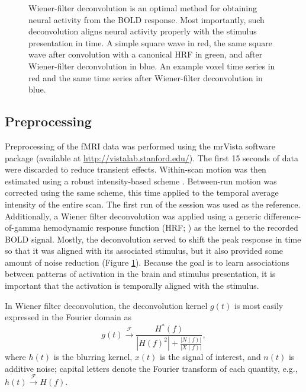 \documentclass[preprint,5p,authoryear]{elsarticle}
\begin{document}
\begin{figure}
\begin{subfigure}{0.4\textwidth}
\caption{}
\label{fig:wiener-voxel}
\end{subfigure}
\caption{
Wiener-filter deconvolution is an optimal method for obtaining neural activity from the BOLD response.
Most importantly, such deconvolution aligns neural activity properly with the stimulus presentation in time.
 A simple square wave in red, the same square wave after convolution with a canonical HRF in green, and after Wiener-filter deconvolution in blue. 
 An example voxel time series in red and the same time series after Wiener-filter deconvolution in blue.}
\label{fig:wiener-deconvolution}
\end{figure}

\subsection{Preprocessing}
Preprocessing of the fMRI data was performed using the mrVista software package (available at \url{http://vistalab.stanford.edu/}). 
The first 15 seconds of data  were discarded to reduce transient effects.
Within-scan motion was then estimated using a robust intensity-based scheme \citep{Nestares2000}. 
Between-run motion was corrected using the same scheme, this time applied to the temporal average intensity of the entire scan. 
The first run of the session was used as the reference. 
Additionally, a Wiener filter deconvolution \citep{Poor1980} was applied using a generic difference-of-gamma hemodynamic response function (HRF; \cite{Glover1999}) as the kernel to the recorded BOLD signal.
Mostly, the deconvolution served to shift the peak response in time so that it was aligned with its associated stimulus, but it also provided some amount of noise reduction (Figure \ref{fig:wiener-voxel}).
Because the goal is to learn associations between patterns of activation in the brain and stimulus presentation, it is important that the activation is temporally aligned with the stimulus.

In Wiener filter deconvolution, the deconvolution kernel $g(t)$ is most easily expressed in the Fourier domain as
\begin{equation}
g(t) \xrightarrow{\mathcal{F}} \frac{H^{*}(f)}{\left|H(f)^{2}\right| + \frac{\left| N(f) \right|}{\left| X(f) \right|}},
\end{equation}
where $h(t)$ is the blurring kernel, $x(t)$ is the signal of interest, and $n(t)$ is additive noise; capital letters denote the Fourier transform of each quantity, e.g., $h(t) \xrightarrow{\mathcal{F}} H(f)$.
\end{document}
